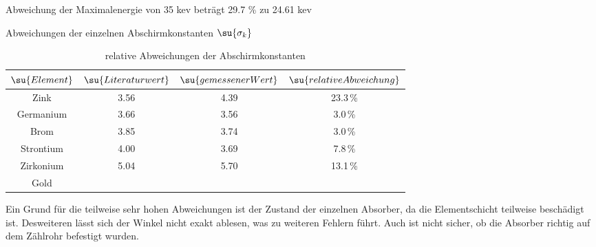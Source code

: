 


Abweichung der Maximalenergie von 35 kev beträgt 29.7 \% zu 24.61 kev

Abweichungen der einzelnen Abschirmkonstanten $\su{\sigma_k}$
\begin{table}
  \centering
  \begin{tabular}{c c c c }
    \toprule
    $\su{Element}$ & $\su{Literaturwert}$ & $\su{gemessener Wert}$ & $\su{relative Abweichung}$ \\
    \midrule
    Zink       & 3.56 & 4.39 & 23.3\,\% \\
    Germanium  & 3.66 & 3.56 &  3.0\,\% \\
    Brom       & 3.85 & 3.74 &  3.0\,\% \\
    Strontium  & 4.00 & 3.69 &  7.8\,\% \\
    Zirkonium  & 5.04 & 5.70 & 13.1\,\% \\
    Gold
    \bottomrule
  \end{tabular}
  \caption{relative Abweichungen der Abschirmkonstanten}
  \label{tab:abw}
\end{table}
Ein Grund für die teilweise sehr hohen Abweichungen ist der Zustand der einzelnen
Absorber, da die Elementschicht teilweise beschädigt ist. Desweiteren lässt sich
der Winkel nicht exakt ablesen, was zu weiteren Fehlern führt. Auch ist nicht
sicher, ob die Absorber richtig auf dem Zählrohr befestigt wurden.

